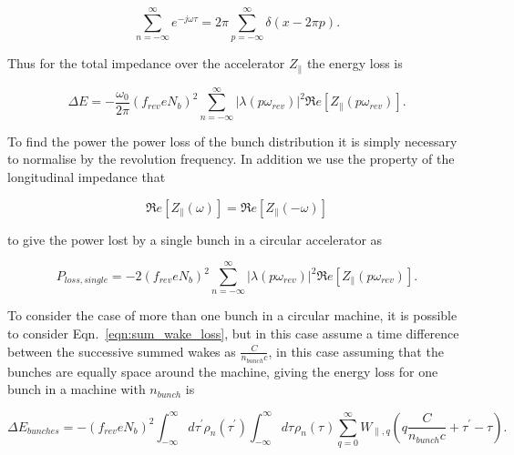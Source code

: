 \begin{equation}
\displaystyle\sum\limits_{n = -\infty}^{\infty} e^{-j\omega \tau} = 2\pi \displaystyle\sum\limits_{p = -\infty}^{\infty} \delta \left( x - 2\pi p \right).
\end{equation}

Thus for the total impedance over the accelerator $Z_{\parallel}$ the energy loss is

\begin{equation}
\Delta E = -\frac{\omega_{0}}{2\pi} \left( f_{rev} e N_{b}\right)^{2} \displaystyle\sum\limits_{n = -\infty}^{\infty}  \left| \lambda \left( p \omega_{rev} \right)  \right|^{2} \Re{}e \left[ Z_{\parallel} \left( p \omega_{rev} \right) \right].
\end{equation}

To find the power the power loss of the bunch distribution it is simply necessary to normalise by the revolution frequency. In addition we use the property of the longitudinal impedance that 

\begin{equation}
\Re{}e \left[ Z_{\parallel} \left( \omega \right) \right] =  \Re{}e \left[ Z_{\parallel} \left( -\omega \right) \right]
\end{equation}

to give the power lost by a single bunch in a circular accelerator as 

\begin{equation}
P_{loss, single} = - 2 \left( f_{rev} e N_{b}\right)^{2} \displaystyle\sum\limits_{n = -\infty}^{\infty}  \left| \lambda \left( p \omega_{rev} \right)  \right|^{2} \Re{}e \left[ Z_{\parallel} \left( p \omega_{rev} \right) \right].
\label{eqn:power_loss_single_bunch}
\end{equation}

To consider the case of more than one bunch in a circular machine, it is possible to consider Eqn.~\ref{eqn:sum_wake_loss}, but in this case assume a time difference between the successive summed wakes as $\frac{C}{n_{bunch}c}$, in this case assuming that the bunches are equally space around the machine, giving the energy loss for one bunch in a machine with $n_{bunch}$ is 

\begin{equation}
\Delta E_{bunches} = - \left( f_{rev} e  N_{b}\right)^{2} \int^{\infty}_{-\infty} d\tau^{'} \rho_{n} \left( \tau^{'} \right) \int^{\infty}_{-\infty} d\tau^{} \rho_{n} \left( \tau^{} \right) \displaystyle\sum\limits_{q = 0}^{\infty} W_{\parallel, q} \left( q\frac{C}{n_{bunch}c} + \tau^{'} - \tau \right).  
\label{eqn:sum_wake_loss_bunches}
\end{equation}

